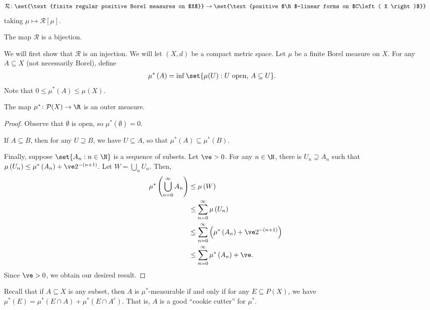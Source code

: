 \documentclass[10pt]{mypackage}
\begin{document}
\begin{align*}
  \mathcal{R}\colon \set{\text{finite regular positive Borel measures on $X$}} \to \set{\text{positive $\R$-linear forms on $C\left( X \right)$}}
\end{align*}
taking $\mu\mapsto \mathcal{R}\left[ \mu \right]$.
\begin{theorem}
  The map $\mathcal{R}$ is a bijection.
\end{theorem}
We will first show that $\mathcal{R}$ is an injection. We will let $\left( X,d \right)$ be a compact metric space. Let $\mu$ be a finite Borel measure on $X$. For any $A\subseteq X$ (not necessarily Borel), define
\begin{align*}
  \mu^{\ast}\left( A \right) &= \inf\set{\mu(U) : U\text{ open, }A\subseteq U}.
\end{align*}
Note that $0\leq \mu^{\ast}\left( A \right)\leq \mu(X)$.
\begin{proposition}
  The map $\mu^{\ast}\colon \mathcal{P}(X)\to \R$ is an outer measure.
\end{proposition}
\begin{proof}
  Observe that $\emptyset$ is open, so $\mu^{\ast}\left( \emptyset \right) = 0$.

  If $A\subseteq B$, then for any $U\supseteq B$, we have $U\subseteq A$, so that $\mu^{\ast}\left( A \right)\subseteq \mu^{\ast}\left( B \right)$.

  Finally, suppose $\set{A_n : n\in \N}$ is a sequence of subsets. Let $\ve > 0$. For any $n\in \N$, there is $U_n\supseteq A_n$ such that $\mu\left( U_n \right)\leq \mu^{\ast}\left( A_n \right) + \ve 2^{-\left( n+1 \right)}$. Let $W = \bigcup_{n} U_n$. Then,
  \begin{align*}
    \mu^{\ast}\left( \bigcup_{n=0}^{\infty}A_n \right) &\leq \mu\left( W \right)\\
                                                       &\leq \sum_{n=0}^{\infty}\mu\left( U_n \right)\\
                                                       &\leq \sum_{n=0}^{\infty}\left( \mu^{\ast}\left( A_n \right) + \ve 2^{-\left( n+1 \right)} \right)\\
                                                       &\leq \sum_{n=0}^{\infty}\mu^{\ast}\left( A_n \right) + \ve.
  \end{align*}
  Since $\ve > 0$, we obtain our desired result.
\end{proof}
Recall that if $A\subseteq X$ is any subset, then $A$ is $\mu^{\ast}$-measurable if and only if for any $E\subseteq P(X)$, we have $\mu^{\ast}\left( E \right) = \mu^{\ast}\left( E\cap A \right) + \mu^{\ast}\left( E\cap A^{c} \right)$. That is, $A$ is a good ``cookie cutter'' for $\mu^{\ast}$.
\end{document}
